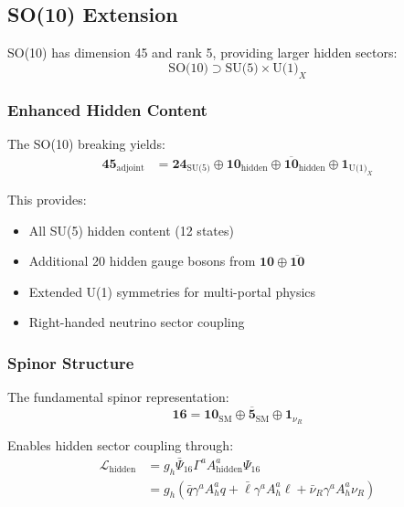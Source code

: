 \documentclass[11pt]{article}
\begin{document}
\subsection{SO(10) Extension}

SO(10) has dimension 45 and rank 5, providing larger hidden sectors:
\begin{equation}
\text{SO(10)} \supset \text{SU(5)} \times \text{U(1)}_X
\end{equation}

\subsubsection{Enhanced Hidden Content}

The SO(10) breaking yields:
\begin{align}
\mathbf{45}_{\text{adjoint}} &= \mathbf{24}_{\text{SU(5)}} \oplus \mathbf{10}_{\text{hidden}} \oplus \mathbf{\overline{10}}_{\text{hidden}} \oplus \mathbf{1}_{\text{U(1)}_X}
\end{align}

This provides:
\begin{itemize}
    \item All SU(5) hidden content (12 states)
    \item Additional 20 hidden gauge bosons from $\mathbf{10} \oplus \mathbf{\overline{10}}$
    \item Extended U(1) symmetries for multi-portal physics
    \item Right-handed neutrino sector coupling
\end{itemize}

\subsubsection{Spinor Structure}

The fundamental spinor representation:
\begin{equation}
\mathbf{16} = \mathbf{10}_{\text{SM}} \oplus \mathbf{\overline{5}}_{\text{SM}} \oplus \mathbf{1}_{\nu_R}
\end{equation}

Enables hidden sector coupling through:
\begin{align}
\mathcal{L}_{\text{hidden}} &= g_h \bar{\Psi}_{16} \Gamma^a A_{\text{hidden}}^a \Psi_{16} \\
&= g_h (\bar{q}\gamma^a A_h^a q + \bar{\ell}\gamma^a A_h^a \ell + \bar{\nu}_R\gamma^a A_h^a \nu_R)
\end{align}
\end{document}
